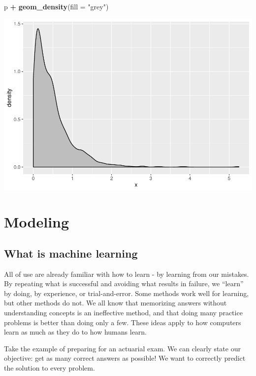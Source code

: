 \documentclass[]{book}
\newenvironment{Shaded}{\begin{snugshade}}{\end{snugshade}}
\newcommand{\DataTypeTok}[1]{\textcolor[rgb]{0.13,0.29,0.53}{#1}}
\newcommand{\KeywordTok}[1]{\textcolor[rgb]{0.13,0.29,0.53}{\textbf{#1}}}
\newcommand{\NormalTok}[1]{#1}
\newcommand{\OperatorTok}[1]{\textcolor[rgb]{0.81,0.36,0.00}{\textbf{#1}}}
\newcommand{\StringTok}[1]{\textcolor[rgb]{0.31,0.60,0.02}{#1}}
\begin{document}
\begin{Shaded}
\begin{Highlighting}[]
\NormalTok{p }\OperatorTok{+}\StringTok{ }\KeywordTok{geom_density}\NormalTok{(}\DataTypeTok{fill =} \StringTok{"grey"}\NormalTok{)}
\end{Highlighting}
\end{Shaded}

\includegraphics{bookdown-demo_files/figure-latex/unnamed-chunk-17-1.pdf}

\hypertarget{modeling}{%
\chapter{Modeling}\label{modeling}}

\hypertarget{what-is-machine-learning}{%
\section{What is machine learning}\label{what-is-machine-learning}}

All of use are already familiar with how to learn - by learning from our mistakes. By repeating what is successful and avoiding what results in failure, we ``learn'' by doing, by experience, or trial-and-error. Some methods work well for learning, but other methods do not. We all know that memorizing answers without understanding concepts is an ineffective method, and that doing many practice problems is better than doing only a few. These ideas apply to how computers learn as much as they do to how humans learn.

Take the example of preparing for an actuarial exam. We can clearly state our objective: get as many correct answers as possible!
We want to correctly predict the solution to every problem.
\end{document}
